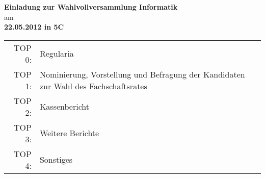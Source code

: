 \documentclass[a4paper,12pt, landscape]{article}
\begin{document}
\begin{center}
\vspace*{8ex}
\huge \textbf{Einladung zur Wahlvollversammlung Informatik}\\[2ex]
\large{am}\\[2ex]
\huge \textbf{22.05.2012 in 5C}\\[6ex]

\large
\begin{tabular}{rl}
TOP 0: &Regularia\\
TOP 1: &Nominierung, Vorstellung und Befragung der Kandidaten zur Wahl des Fachschaftsrates\\
TOP 2: &Kassenbericht\\
TOP 3: &Weitere Berichte\\
TOP 4: &Sonstiges
\end{tabular}

\end{center}
\end{document}
